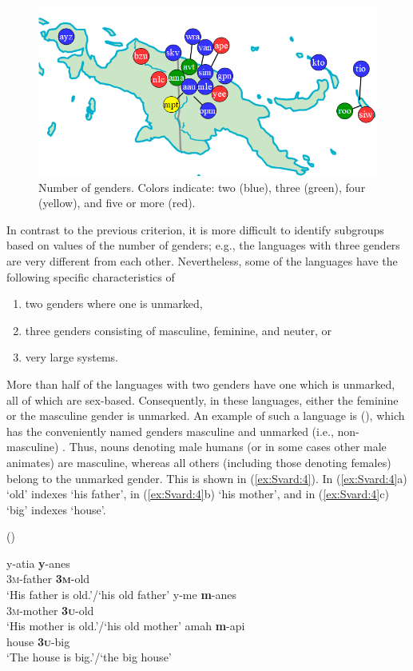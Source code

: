 \documentclass[output=collectionpaper]{langsci/langscibook}
\begin{document}
\begin{figure}[p]
\includegraphics[width=.8\textwidth]{figures/09/Simple/fig3.png}
\caption{Number of genders. Colors indicate: two (blue), three (green), four (yellow), and five or more (red).}
\label{fig:Svard:3}
\end{figure}



In contrast to the previous criterion, it is more difficult to identify subgroups based on values of the number of genders; e.g., the languages with three genders are very different from each other. Nevertheless, some of the languages have the following specific characteristics of

\begin{enumerate}
\item two genders where one is unmarked,
\item three genders consisting of masculine, feminine, and neuter, or
\item very large systems.
\end{enumerate}

More than half of the languages with two genders have one which is unmarked, all of which are sex-based. Consequently, in these languages, either the feminine or the masculine gender is unmarked. An example of such a language is  (), which has the conveniently named genders masculine and unmarked (i.e., non-masculine) \citep[89]{Dol2007}. Thus, nouns denoting male humans (or in some cases other male animates) are masculine, whereas all others (including those denoting females) belong to the unmarked gender. This is shown in (\ref{ex:Svard:4}). In (\ref{ex:Svard:4}a) `old' indexes `his father', in (\ref{ex:Svard:4}b) `his mother', and in (\ref{ex:Svard:4}c) `big' indexes `house'.

\ea
\label{ex:Svard:4}
 () \citep[90]{Dol2007}\\
\begin{xlist}
\ex
\gll y-atia \textbf{y}{}-anes\\
     \textsc{3m-}father \textsc{\textbf{3m}}{}-old\\
\glt `His father is old.'/`his old father'
\ex
\gll y-me \textbf{m}{}-anes\\
     \textsc{3m-}mother \textsc{\textbf{3u}}{}-old\\
\glt `His mother is old.'/`his old mother'
\ex
\gll amah \textbf{m}{}-api\\
     house \textsc{\textbf{3u}}{}-big\\
\glt `The house is big.'/`the big house'
\end{xlist}
\z
\end{document}

